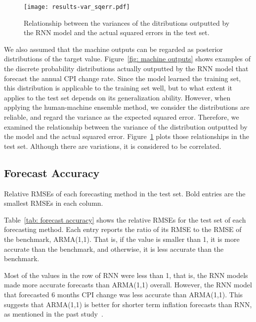 \documentclass[../main.tex]{subfiles}
\begin{document}
\begin{figure}
  \centering
  \texttt{[image: results-var\_sqerr.pdf]}
  \caption{
    Relationship between the variances of the ditributions outputted by the RNN model and the actual squared errors in the test set.
  }\label{fig: var-sqerr}
\end{figure}

We also assumed that the machine outputs can be regarded as posterior distributions of the target value.
Figure~\ref{fig: machine outputs} shows examples of the discrete probability distributions actually outputted by the RNN model that forecast the annual CPI change rate.
Since the model learned the training set, this distribution is applicable to the training set well, but to what extent it applies to the test set depends on its generalization ability.
However, when applying the human-machine ensemble method, we consider the distributions are reliable, and regard the variance as the expected squared error.
Therefore, we examined the relationship between the variance of the distribution outputted by the model and the actual squared error.
Figure~\ref{fig: var-sqerr} plots those relationships in the test set.
Although there are variations, it is considered to be correlated.

\subsection{Forecast Accuracy}
\label{sub: Forecast Accuracy}

\begin{table}[t]
  \caption{
    Relative RMSEs of each forecasting method in the test set.
    Bold entries are the smallest RMSEs in each column.
  }\label{tab: forecast accuracy}
  \begin{center}
    \small
    
  \end{center}
\end{table}

Table~\ref{tab: forecast accuracy} shows the relative RMSEs for the test set of each forecasting method.
Each entry reports the ratio of its RMSE to the RMSE of the benchmark, ARMA(1,1).
That is, if the value is smaller than 1, it is more accurate than the benchmark, and otherwise, it is less accurate than the benchmark.

Most of the values in the row of RNN were less than 1, that is, the RNN models made more accurate forecasts than ARMA(1,1) overall.
However, the RNN model that forecasted 6 months CPI change was less accurate than ARMA(1,1).
This suggests that ARMA(1,1) is better for shorter term inflation forecasts than RNN, as mentioned in the past study~\cite{Nakamura2005}.
\end{document}
